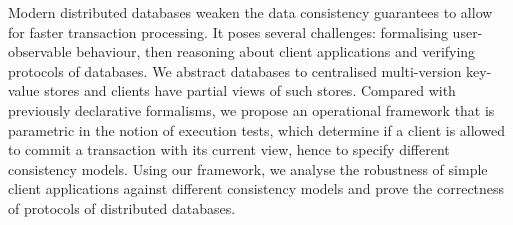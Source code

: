 Modern distributed databases weaken the data consistency guarantees 
to allow for faster transaction processing. 
It poses several challenges: formalising user-observable behaviour,
then reasoning about client applications 
and verifying protocols of databases.
We abstract databases to centralised multi-version key-value stores and 
clients have partial views of such stores.
Compared with previously declarative formalisms,
we propose an operational framework that is parametric in the notion of execution tests, 
which determine if a client is allowed to commit a transaction with its current view,
hence to specify different consistency models. 
Using our framework, 
we analyse the robustness of simple client applications 
against different consistency models and prove the correctness 
of protocols of distributed databases.
